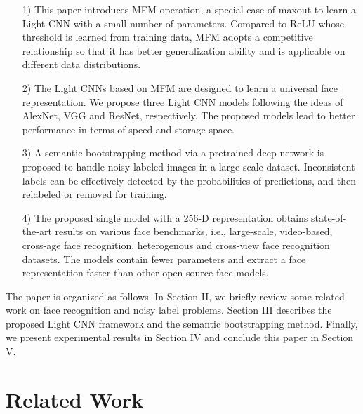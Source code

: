 \documentclass[journal,transmag]{IEEEtran}
\begin{document}
\begin{itemize}\setlength{\itemsep}{1pt}
\item[1)] This paper introduces MFM operation, a special case of maxout to learn a Light CNN with a small number of parameters. Compared to ReLU whose threshold is learned from training data, MFM adopts a competitive relationship so that it has better generalization ability and is applicable on different data distributions.
\item[2)] The Light CNNs based on MFM are designed to learn a universal face representation. We propose three Light CNN models following the ideas of AlexNet, VGG and ResNet, respectively. The proposed models lead to better performance in terms of speed and storage space.
\item[3)] A semantic bootstrapping method via a pretrained deep network is proposed to handle noisy labeled images in a large-scale dataset. Inconsistent labels can be effectively detected by the probabilities of predictions, and then relabeled or removed for training.
\item[4)] The proposed single model with a 256-D representation obtains state-of-the-art results on various face benchmarks, i.e., large-scale, video-based, cross-age face recognition, heterogenous and cross-view face recognition datasets. The models contain fewer parameters and extract a face representation faster than other open source face models.%
\end{itemize}

The paper is organized as follows. In Section II, we briefly review some related work on face recognition and noisy label problems. Section III describes the proposed Light CNN framework and the semantic bootstrapping method. Finally, we present experimental results in Section IV and conclude this paper in Section V.

\section{Related Work}
\end{document}
